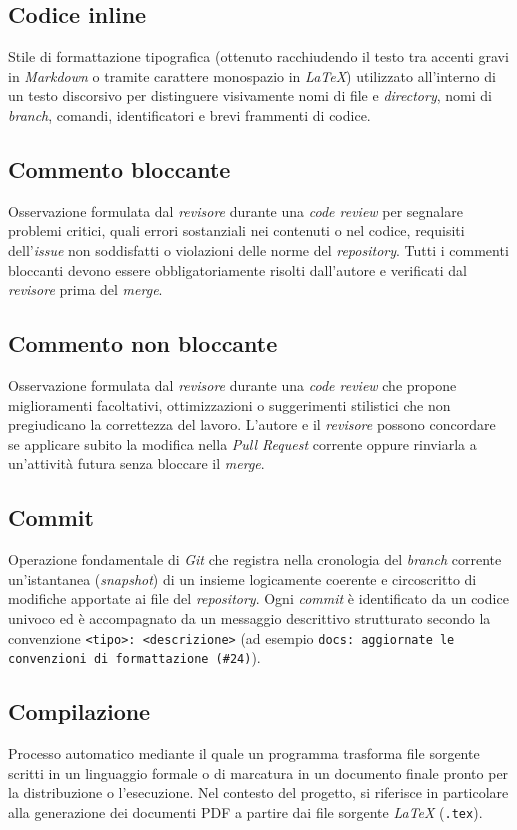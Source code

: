 \documentclass[11pt, a4paper]{article}
\begin{document}
\subsection*{Codice inline}
Stile di formattazione tipografica (ottenuto racchiudendo il testo tra accenti gravi in \textit{Markdown} o tramite carattere monospazio in \textit{LaTeX}) utilizzato all'interno di un testo discorsivo per distinguere visivamente nomi di file e \textit{directory}, nomi di \textit{branch}, comandi, identificatori e brevi frammenti di codice.

\subsection*{Commento bloccante}
Osservazione formulata dal \textit{revisore} durante una \textit{code review} per segnalare problemi critici, quali errori sostanziali nei contenuti o nel codice, requisiti dell'\textit{issue} non soddisfatti o violazioni delle norme del \textit{repository}. Tutti i commenti bloccanti devono essere obbligatoriamente risolti dall'autore e verificati dal \textit{revisore} prima del \textit{merge}.

\subsection*{Commento non bloccante}
Osservazione formulata dal \textit{revisore} durante una \textit{code review} che propone miglioramenti facoltativi, ottimizzazioni o suggerimenti stilistici che non pregiudicano la correttezza del lavoro. L'autore e il \textit{revisore} possono concordare se applicare subito la modifica nella \textit{Pull Request} corrente oppure rinviarla a un'attività futura senza bloccare il \textit{merge}.

\subsection*{Commit}
Operazione fondamentale di \textit{Git} che registra nella cronologia del \textit{branch} corrente un'istantanea (\textit{snapshot}) di un insieme logicamente coerente e circoscritto di modifiche apportate ai file del \textit{repository}. Ogni \textit{commit} è identificato da un codice univoco ed è accompagnato da un messaggio descrittivo strutturato secondo la convenzione \texttt{<tipo>: <descrizione>} (ad esempio \texttt{docs: aggiornate le convenzioni di formattazione (\#24)}).

\subsection*{Compilazione}
Processo automatico mediante il quale un programma trasforma file sorgente scritti in un linguaggio formale o di marcatura in un documento finale pronto per la distribuzione o l'esecuzione. Nel contesto del progetto, si riferisce in particolare alla generazione dei documenti PDF a partire dai file sorgente \textit{LaTeX} (\texttt{.tex}).
\end{document}
